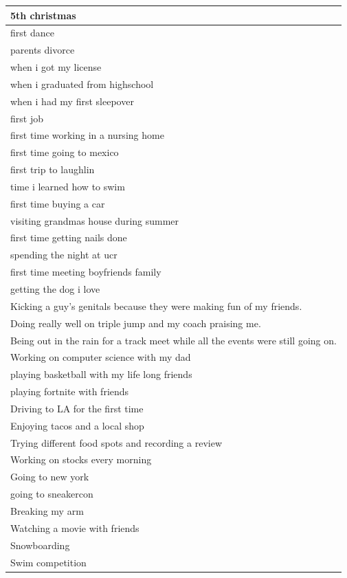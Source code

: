 \documentclass[
  .7em,
  letterpaper,
  DIV=11,
  numbers=noendperiod]{scrartcl}
\begin{document}
\begin{table}
\begin{tabular}{l}
\hline
5th christmas\\
\hline
first dance\\
\hline
parents divorce\\
\hline
when i got my license\\
\hline
when i graduated from highschool\\
\hline
when i had my first sleepover\\
\hline
first job\\
\hline
first time working in a nursing home\\
\hline
first time going to mexico\\
\hline
first trip to laughlin\\
\hline
time i learned how to swim\\
\hline
first time buying a car\\
\hline
visiting grandmas house during summer\\
\hline
first time getting nails done\\
\hline
spending the night at ucr\\
\hline
first time meeting boyfriends family\\
\hline
getting the dog i love\\
\hline
Kicking a guy's genitals because they were making fun of my friends.\\
\hline
Doing really well on triple jump and my coach praising me.\\
\hline
Being out in the rain for a track meet while all the events were still going on.\\
\hline
Working on computer science with my dad\\
\hline
playing basketball with my life long friends\\
\hline
playing fortnite with friends\\
\hline
Driving to LA for the first time\\
\hline
Enjoying tacos and a local shop\\
\hline
Trying different food spots and recording a review\\
\hline
Working on stocks every morning\\
\hline
Going to new york\\
\hline
going to sneakercon\\
\hline
Breaking my arm\\
\hline
Watching a movie with friends\\
\hline
Snowboarding\\
\hline
Swim competition\\

\end{tabular}
\end{table}
\end{document}
